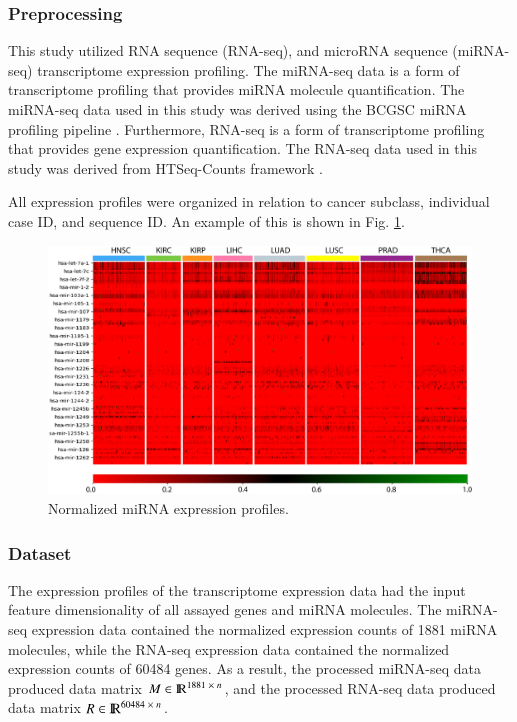 \subsubsection{Preprocessing}

This study utilized RNA sequence (RNA-seq), and microRNA sequence (miRNA-seq) transcriptome expression profiling. The miRNA-seq data is a form of transcriptome profiling that provides miRNA molecule quantification. The miRNA-seq data used in this study was derived using the BCGSC miRNA profiling pipeline \cite{chu2015large}. Furthermore, RNA-seq is a form of transcriptome profiling that provides gene expression quantification. The RNA-seq data used in this study was derived from HTSeq-Counts framework \cite{anders2015htseq}.

All expression profiles were organized in relation to cancer subclass, individual case ID, and sequence ID. An example of this is shown in Fig. \ref{fig:expmirna}.

\begin{figure}[h!]
    \centering
    \includegraphics[width=\textwidth]{img/expmirna.png}
    \noindent
    \caption{Normalized miRNA expression profiles.}
    \label{fig:expmirna}
\end{figure}

\subsubsection{Dataset}

The expression profiles of the transcriptome expression data had the input feature dimensionality of all assayed genes and miRNA molecules. The miRNA-seq expression data contained the normalized expression counts of 1881 miRNA molecules, while the RNA-seq expression data contained the normalized expression counts of 60484 genes. As a result, the processed miRNA-seq data produced data matrix $M \in {\rm I\!R}^{1881 \; \times \; n}$, and the processed RNA-seq data produced data matrix $R \in {\rm I\!R}^{60484 \; \times \; n}$.

